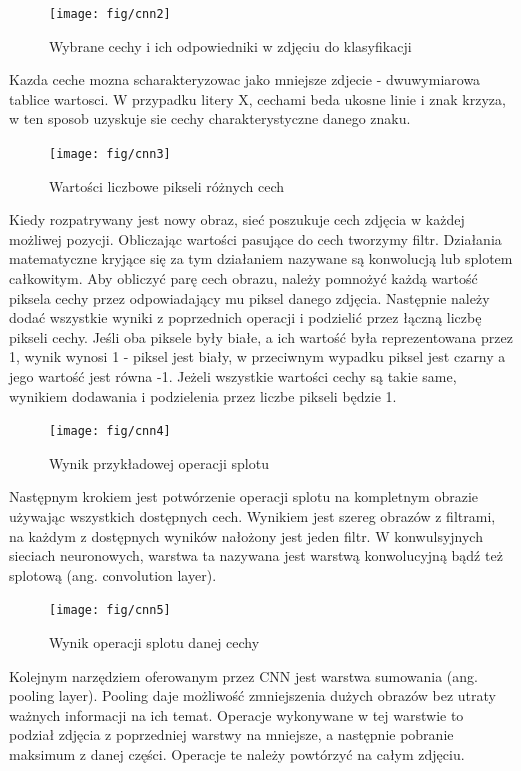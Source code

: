 \documentclass[brudnopis]{xmgr}
\begin{document}
\begin{figure}[!tbh]
\centering
\texttt{[image: fig/cnn2]}
\caption{Wybrane cechy i ich odpowiedniki w zdjęciu do klasyfikacji}
\end{figure}

Kazda ceche mozna scharakteryzowac jako mniejsze zdjecie - dwuwymiarowa tablice wartosci. W przypadku litery X, cechami beda ukosne linie i znak krzyza, w ten sposob uzyskuje sie cechy charakterystyczne danego znaku.

\begin{figure}[!tbh]
\centering
\texttt{[image: fig/cnn3]}
\caption{Wartości liczbowe pikseli różnych cech}
\end{figure}
\newpage

Kiedy rozpatrywany jest nowy obraz, sieć poszukuje cech zdjęcia w każdej możliwej pozycji. Obliczając wartości pasujące do cech  tworzymy filtr. Działania matematyczne kryjące się za tym działaniem nazywane są konwolucją lub splotem całkowitym. Aby obliczyć parę cech obrazu, należy pomnożyć każdą wartość piksela cechy przez odpowiadający mu piksel danego zdjęcia. Następnie należy dodać wszystkie wyniki z poprzednich operacji i podzielić przez łączną liczbę pikseli cechy. Jeśli oba piksele były białe, a ich wartość była reprezentowana przez 1, wynik wynosi 1 - piksel jest biały, w przeciwnym wypadku piksel jest czarny a jego wartość jest równa -1. Jeżeli wszystkie wartości cechy są takie same, wynikiem dodawania i podzielenia przez liczbe pikseli będzie 1.

\begin{figure}[!tbh]
\centering
\texttt{[image: fig/cnn4]}
\caption{Wynik przykładowej operacji splotu}
\end{figure}
\newpage

Następnym krokiem jest potwórzenie operacji splotu na kompletnym obrazie używając wszystkich dostępnych cech. Wynikiem jest szereg obrazów z filtrami, na każdym z dostępnych wyników nałożony jest jeden filtr. W konwulsyjnych sieciach neuronowych, warstwa ta nazywana jest warstwą konwolucyjną bądź też splotową (ang. convolution layer).

\begin{figure}[!tbh]
\centering
\texttt{[image: fig/cnn5]}
\caption{Wynik operacji splotu danej cechy}
\end{figure}
\newpage

Kolejnym narzędziem oferowanym przez CNN jest warstwa sumowania (ang. pooling layer). Pooling daje możliwość zmniejszenia dużych obrazów bez utraty ważnych informacji na ich temat. Operacje wykonywane w tej warstwie to podział zdjęcia z poprzedniej warstwy na mniejsze, a następnie pobranie maksimum z danej części. Operacje te należy powtórzyć na całym zdjęciu.
\end{document}
